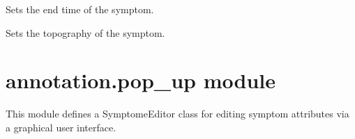 \documentclass[letterpaper,10pt,english]{sphinxmanual}
\begin{document}
\begin{fulllineitems}
\begin{fulllineitems}
\end{fulllineitems}


\begin{fulllineitems}
\label{\detokenize{annotation:annotation.class_symptome.Symptome.set_Tfin}}
\pysigstartsignatures
{}
\pysigstopsignatures
\sphinxAtStartPar
Sets the end time of the symptom.

\end{fulllineitems}


\begin{fulllineitems}
\label{\detokenize{annotation:annotation.class_symptome.Symptome.set_Topography}}
\pysigstartsignatures
{}
\pysigstopsignatures
\sphinxAtStartPar
Sets the topography of the symptom.

\end{fulllineitems}


\end{fulllineitems}



\section{annotation.pop\_up module}
\label{\detokenize{annotation:module-annotation.pop_up}}\label{\detokenize{annotation:annotation-pop-up-module}}
\sphinxAtStartPar
This module defines a SymptomeEditor class for editing symptom attributes via a graphical user interface.
\end{document}
